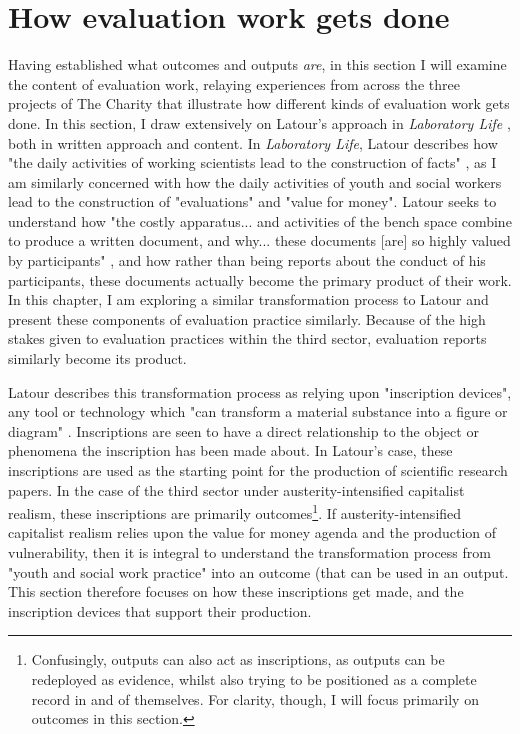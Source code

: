 \section{How evaluation work gets done}
\label{sec: 6-4-eval-work}
Having established what outcomes and outputs \emph{are}, in this section I will examine the content of evaluation work, relaying experiences from across the three projects of The Charity that illustrate how different kinds of evaluation work gets done. In this section, I draw extensively on Latour's approach in \emph{Laboratory Life} \citep{latour_laboratory_1986}, both in written approach and content. In \emph{Laboratory Life}, Latour describes how "the daily activities of working scientists lead to the construction of facts" \citep[p. 40]{latour_laboratory_1986}, as I am similarly concerned with how the daily activities of youth and social workers lead to the construction of "evaluations" and "value for money". Latour seeks to understand how "the costly apparatus... and activities of the bench space combine to produce a written document, and why... these documents [are] so highly valued by participants" \citep[p. 48]{latour_laboratory_1986}, and how rather than being reports about the conduct of his participants, these documents actually become the primary product of their work. In this chapter, I am exploring a similar transformation process to Latour and present these components of evaluation practice similarly. Because of the high stakes given to evaluation practices within the third sector, evaluation reports similarly become its product. 

Latour describes this transformation process as relying upon "inscription devices", any tool or technology which "can transform a material substance into a figure or diagram" \citep[p. 51]{latour_laboratory_1986}. Inscriptions are seen to have a direct relationship to the object or phenomena the inscription has been made about. In Latour's case, these inscriptions are used as the starting point for the production of scientific research papers. In the case of the third sector under austerity-intensified capitalist realism, these inscriptions are primarily outcomes\footnote{Confusingly, outputs can also act as inscriptions, as outputs can be redeployed as evidence, whilst also trying to be positioned as a complete record in and of themselves. For clarity, though, I will focus primarily on outcomes in this section.}.  If austerity-intensified capitalist realism relies upon the value for money agenda and the production of vulnerability, then it is integral to understand the transformation process from "youth and social work practice" into an outcome (that can be used in an output. This section therefore focuses on how  these inscriptions get made, and the inscription devices that support their production.

